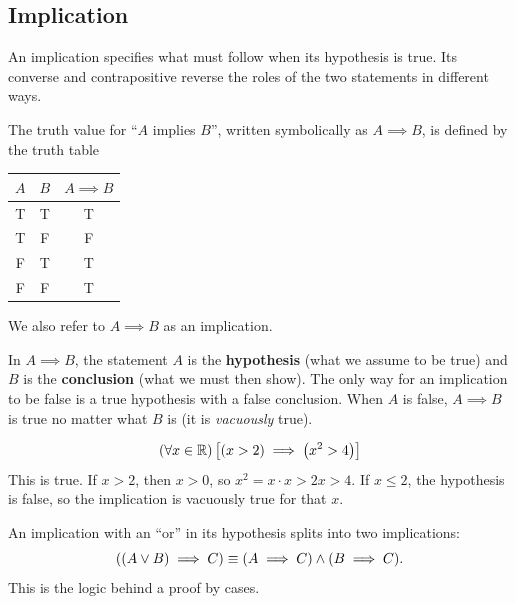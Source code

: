 \subsection{Implication}
An implication specifies what must follow when its hypothesis is true.
Its converse and contrapositive reverse the roles of the two statements
in different ways.
\begin{definition}[Implication]
    The truth value for ``$A$ implies $B$'', written symbolically as $A \implies B$, is defined by the truth table
    \begin{center}
        \begin{tabular}{c|c|c}
        $A$ & $B$ & $A \implies B$ \\
        \hline
        T & T & T \\
        T & F & F \\
        F & T & T \\
        F & F & T
        \end{tabular}
    \end{center}

    We also refer to $A \implies B$ as an implication.
\end{definition}

In $A \implies B$, the statement $A$ is the \textbf{hypothesis} (what we assume to be true) and
$B$ is the \textbf{conclusion} (what we must then show). The only way for an implication to be false
is a true hypothesis with a false conclusion. When $A$ is false, $A \implies B$ is true no matter
what $B$ is (it is \emph{vacuously} true).

\begin{example}
    \begin{equation*}
        \left(\forall x \in \mathbb{R}\right)\left[\left(x > 2 \right) \implies \left(x^2 > 4\right)\right]
    \end{equation*}
    This is true. If $x > 2$, then $x > 0$, so $x^2 = x \cdot x > 2x > 4$. If $x \leq 2$, the
    hypothesis is false, so the implication is vacuously true for that $x$.
\end{example}

\begin{remark}
    An implication with an ``or'' in its hypothesis splits into two implications:
    \begin{equation*}
        \left((A \vee B) \implies C\right)
        \equiv (A \implies C) \wedge (B \implies C).
    \end{equation*}
    This is the logic behind a proof by cases.
\end{remark}

